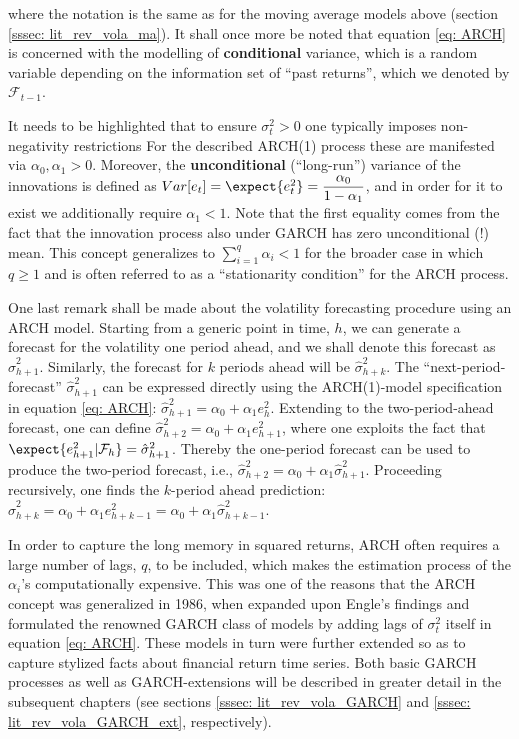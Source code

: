 where the notation is the same as for the moving average models above (section \ref{sssec: lit_rev_vola_ma}). It shall once more be noted that equation \eqref{eq: ARCH} is concerned with the modelling of \textbf{conditional} variance, which is a random variable depending on the information set of \enquote{past returns}, which we denoted by $\mathcal{F}_{t-1}$.

It needs to be highlighted that to ensure $\sigma_{t}^2 > 0$ one typically imposes non-negativity restrictions For the described ARCH(1) process these are manifested via $\alpha_0, \alpha_1 > 0$. Moreover, the \textbf{unconditional} (\enquote{long-run}) variance of the innovations is defined as $Var[e_t] = \expect{e_t^2} = \dfrac{\alpha_0}{1-\alpha_1}$, and in order for it to exist we additionally require $\alpha_1 < 1$. Note that the first equality comes from the fact that the innovation process also under GARCH has zero unconditional (!) mean. This concept generalizes to $\sum_{i=1}^q \alpha_i < 1$ for the broader case in which $q \geq 1$ and is often referred to as a \enquote{stationarity condition} for the ARCH process.

One last remark shall be made about the volatility forecasting procedure using an ARCH model. Starting from a generic point in time, $h$, we can generate a forecast for the volatility one period ahead, and we shall denote this forecast as $\hat{\sigma}_{h+1}^2$. Similarly, the forecast for $k$ periods ahead will be $\hat{\sigma}_{h+k}^2$. The \enquote{next-period-forecast} $\hat{\sigma}_{h+1}^2$ can be expressed directly using the ARCH(1)-model specification in equation \eqref{eq: ARCH}: $\hat{\sigma}_{h+1}^2 = \alpha_0 + \alpha_1 e_{h}^2 $. Extending to the two-period-ahead forecast, one can define $\hat{\sigma}_{h+2}^2 = \alpha_0 + \alpha_1 e_{h+1}^2 $, where one exploits the fact that $\expect{e_{h+1}^2 | \mathcal{F}_{h}} = \hat{\sigma}_{h+1}^2 $. Thereby the one-period forecast can be used to produce the two-period forecast, i.e., $\hat{\sigma}_{h+2}^2 = \alpha_0 + \alpha_1 \hat{\sigma}_{h+1}^2$. Proceeding recursively, one finds the $k$-period ahead prediction: $\hat{\sigma}_{h+k}^2 = \alpha_0 + \alpha_1 e_{h+k-1}^2 = \alpha_0 + \alpha_1 \hat{\sigma}_{h+k-1}^2 $.

In order to capture the long memory in squared returns, ARCH often requires a large number of lags, $q$, to be included, which makes the estimation process of the $\alpha_i$'s computationally expensive. This was one of the reasons that the ARCH concept was generalized in 1986, when \textcite{Bollerslev1986} expanded upon Engle's findings and formulated the renowned GARCH class of models by adding lags of $\sigma_t^2$ itself in equation \eqref{eq: ARCH}. These models in turn were further extended so as to capture stylized facts about financial return time series. Both basic GARCH processes as well as GARCH-extensions will be described in greater detail in the subsequent chapters (see sections \ref{sssec: lit_rev_vola_GARCH} and \ref{sssec: lit_rev_vola_GARCH_ext}, respectively). 

